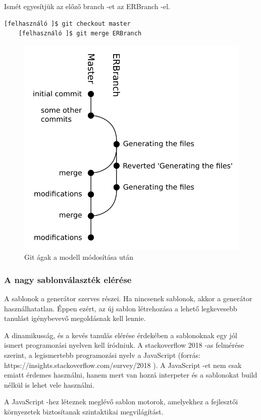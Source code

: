 \documentclass[a4paper,12pt,oneside]{report}
\begin{document}
\begin{justify}
	Ismét egyesítjük az előző branch -et az ERBranch -el. 

	\begin{lstlisting}[language=bash]
	[felhasználó ]$ git checkout master
	[felhasználó ]$ git merge ERBranch
	\end{lstlisting}

	\begin{figure}[h]
		\includegraphics[width=\textwidth]{contents/images/git_second.png}
		\caption{Git ágak a modell módosítása után}
		\label{fig:git_second}
	\end{figure}


\end{justify}

\newpage
\subsubsection{A nagy sablonválaszték elérése}

\begin{justify}

	A sablonok a generátor szerves részei. Ha nincsenek sablonok, akkor a generátor használhatatlan. Éppen ezért, az új sablon létrehozása a lehető legkevesebb tanulást igénybevevő megoldásnak kell lennie. 

	A dinamikusság, és a kevés tanulás elérése érdekében a sablonoknak egy jól ismert programozási nyelven kell íródniuk. A stackoverflow 2018 -as felmérése szerint, a legismertebb programozási nyelv a JavaScript (forrás: https://insights.stackoverflow.com/survey/2018 ). A JavaScript -et nem csak emiatt érdemes használni, hanem mert van hozzá interpeter és a sablonokat build nélkül is lehet vele használni.

	A JavaScript -hez léteznek meglévő sablon motorok, amelyekhez a fejlesztői környezetek biztosítanak szintaktikai megvilágítást.


\end{justify}
\end{document}
